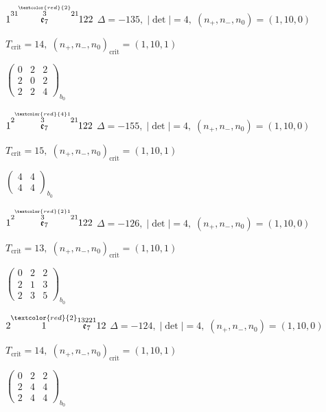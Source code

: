 \documentclass[10pt]{article}
\begin{document}
$1\overset{31\overset{\textcolor{red}{2}}{3}21}{\mathfrak{e}_7}122$ \quad $\Delta=-135,\; |\det|=4,\; (n_+,n_-,n_0)=(1,10,0)$

\hspace{1em}$T_{\text{crit}}=14,\; (n_+,n_-,n_0)_{\text{crit}}=(1,10,1)$

\hspace{2em}$\left(\begin{smallmatrix}0 & 2 & 2 \\ 2 & 0 & 2 \\ 2 & 2 & 4\end{smallmatrix}\right)_{\!b_0}$

\smallskip

$1\overset{2\overset{\textcolor{red}{4}1}{3}21}{\mathfrak{e}_7}122$ \quad $\Delta=-155,\; |\det|=4,\; (n_+,n_-,n_0)=(1,10,0)$

\hspace{1em}$T_{\text{crit}}=15,\; (n_+,n_-,n_0)_{\text{crit}}=(1,10,1)$

\hspace{2em}$\left(\begin{smallmatrix}4 & 4 \\ 4 & 4\end{smallmatrix}\right)_{\!b_0}$

$1\overset{2\overset{\textcolor{red}{2}1}{3}21}{\mathfrak{e}_7}122$ \quad $\Delta=-126,\; |\det|=4,\; (n_+,n_-,n_0)=(1,10,0)$

\hspace{1em}$T_{\text{crit}}=13,\; (n_+,n_-,n_0)_{\text{crit}}=(1,10,1)$

\hspace{2em}$\left(\begin{smallmatrix}0 & 2 & 2 \\ 2 & 1 & 3 \\ 2 & 3 & 5\end{smallmatrix}\right)_{\!b_0}$

\smallskip

$2\overset{\textcolor{red}{2}}{1}\overset{13221}{\mathfrak{e}_7}12$ \quad $\Delta=-124,\; |\det|=4,\; (n_+,n_-,n_0)=(1,10,0)$

\hspace{1em}$T_{\text{crit}}=14,\; (n_+,n_-,n_0)_{\text{crit}}=(1,10,1)$

\hspace{2em}$\left(\begin{smallmatrix}0 & 2 & 2 \\ 2 & 4 & 4 \\ 2 & 4 & 4\end{smallmatrix}\right)_{\!b_0}$
\end{document}
